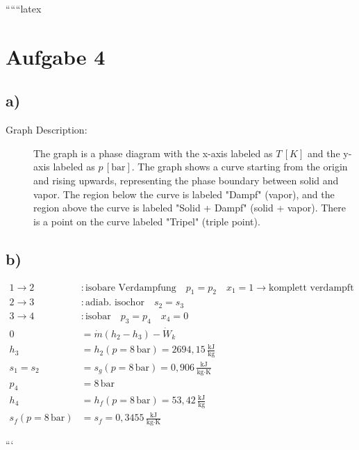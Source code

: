 
``````latex


\section*{Aufgabe 4}

\subsection*{a)}

\begin{description}
    \item[Graph Description:] The graph is a phase diagram with the x-axis labeled as $T \, [K]$ and the y-axis labeled as $p \, [\text{bar}]$. The graph shows a curve starting from the origin and rising upwards, representing the phase boundary between solid and vapor. The region below the curve is labeled "Dampf" (vapor), and the region above the curve is labeled "Solid + Dampf" (solid + vapor). There is a point on the curve labeled "Tripel" (triple point).
\end{description}

\subsection*{b)}

\begin{align*}
1 \rightarrow 2 &: \text{isobare Verdampfung} \quad p_1 = p_2 \quad x_1 = 1 \rightarrow \text{komplett verdampft} \\
2 \rightarrow 3 &: \text{adiab. isochor} \quad s_2 = s_3 \\
3 \rightarrow 4 &: \text{isobar} \quad p_3 = p_4 \quad x_4 = 0 \\
0 &= \dot{m} \left( h_2 - h_3 \right) - \dot{W}_k \\
h_3 &= h_2 (p = 8 \, \text{bar}) = 2694{,}15 \, \frac{\text{kJ}}{\text{kg}} \\
s_1 = s_2 &= s_g (p = 8 \, \text{bar}) = 0{,}906 \, \frac{\text{kJ}}{\text{kg} \cdot \text{K}} \\
p_4 &= 8 \, \text{bar} \\
h_4 &= h_f (p = 8 \, \text{bar}) = 53{,}42 \, \frac{\text{kJ}}{\text{kg}} \\
s_f (p = 8 \, \text{bar}) &= s_f = 0{,}3455 \, \frac{\text{kJ}}{\text{kg} \cdot \text{K}}
\end{align*}

```